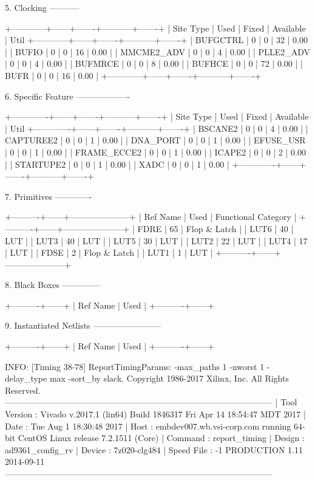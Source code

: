 \documentclass{article}
\begin{document}
5. Clocking
-----------

+------------+------+-------+-----------+-------+
|  Site Type | Used | Fixed | Available | Util%
+------------+------+-------+-----------+-------+
| BUFGCTRL   |    0 |     0 |        32 |  0.00 |
| BUFIO      |    0 |     0 |        16 |  0.00 |
| MMCME2_ADV |    0 |     0 |         4 |  0.00 |
| PLLE2_ADV  |    0 |     0 |         4 |  0.00 |
| BUFMRCE    |    0 |     0 |         8 |  0.00 |
| BUFHCE     |    0 |     0 |        72 |  0.00 |
| BUFR       |    0 |     0 |        16 |  0.00 |
+------------+------+-------+-----------+-------+


6. Specific Feature
-------------------

+-------------+------+-------+-----------+-------+
|  Site Type  | Used | Fixed | Available | Util%
+-------------+------+-------+-----------+-------+
| BSCANE2     |    0 |     0 |         4 |  0.00 |
| CAPTUREE2   |    0 |     0 |         1 |  0.00 |
| DNA_PORT    |    0 |     0 |         1 |  0.00 |
| EFUSE_USR   |    0 |     0 |         1 |  0.00 |
| FRAME_ECCE2 |    0 |     0 |         1 |  0.00 |
| ICAPE2      |    0 |     0 |         2 |  0.00 |
| STARTUPE2   |    0 |     0 |         1 |  0.00 |
| XADC        |    0 |     0 |         1 |  0.00 |
+-------------+------+-------+-----------+-------+


7. Primitives
-------------

+----------+------+---------------------+
| Ref Name | Used | Functional Category |
+----------+------+---------------------+
| FDRE     |   65 |        Flop & Latch |
| LUT6     |   40 |                 LUT |
| LUT3     |   40 |                 LUT |
| LUT5     |   30 |                 LUT |
| LUT2     |   22 |                 LUT |
| LUT4     |   17 |                 LUT |
| FDSE     |    2 |        Flop & Latch |
| LUT1     |    1 |                 LUT |
+----------+------+---------------------+


8. Black Boxes
--------------

+----------+------+
| Ref Name | Used |
+----------+------+


9. Instantiated Netlists
------------------------

+----------+------+
| Ref Name | Used |
+----------+------+

\fi
\iffalse
INFO: [Timing 38-78] ReportTimingParams: -max_paths 1 -nworst 1 -delay_type max -sort_by slack.
Copyright 1986-2017 Xilinx, Inc. All Rights Reserved.
-----------------------------------------------------------------------------------------------
| Tool Version : Vivado v.2017.1 (lin64) Build 1846317 Fri Apr 14 18:54:47 MDT 2017
| Date         : Tue Aug  1 18:30:48 2017
| Host         : embdev007.wb.vsi-corp.com running 64-bit CentOS Linux release 7.2.1511 (Core)
| Command      : report_timing
| Design       : ad9361_config_rv
| Device       : 7z020-clg484
| Speed File   : -1  PRODUCTION 1.11 2014-09-11
-----------------------------------------------------------------------------------------------
\end{document}
